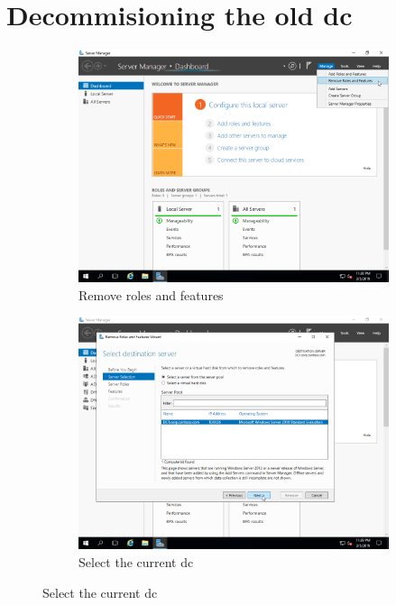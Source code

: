 \section{Decommisioning the old \acrshort{dc}}
\begin{figure}[!htb]
	\begin{subfigure}{0.5\textwidth}
		\captionsetup{width=0.8\linewidth}
		\includegraphics[width=0.9\linewidth]{img/Methodologie/Migration29.png}
		\centering
		\caption{Remove roles and features}
	\end{subfigure}
	\begin{subfigure}{0.5\textwidth}
		\captionsetup{width=0.8\linewidth}
		\includegraphics[width=0.9\linewidth]{img/Methodologie/Migration30.png} 
		\centering
		\caption{Select the current \acrshort{dc}}
	\end{subfigure}
\end{figure}
